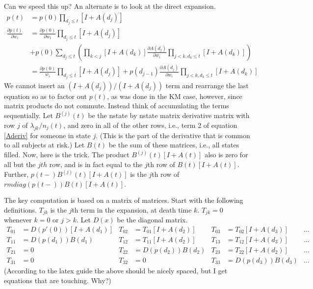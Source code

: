 \documentclass{article}
\begin{document}
Can we speed this up?
An alternate is to look at the direct expansion.
\begin{align}
  p(t) &= p(0) \prod_{d_j \le t} [I+ A(d_j)] \nonumber \\
  \frac{\partial p(t)}{\partial w_i} &=
     \frac{\partial p(0)}{\partial w_i} \prod_{d_j \le t} [I+ A(d_j)] \\
     &  + p(0)\sum_{d_j \le t} \left( \prod_{k<j}[I+ A(d_k)]
            \frac{\partial A(d_j)}{\partial w_i}  
            \prod_{j<k, d_k\le t}[I+ A(d_k)]  \right)\nonumber \\
   &= \frac{\partial p(0)}{w_i} \prod_{d_j \le t} [I+ A(d_j)] +  
            p(d_{j-1}) \frac{\partial A(d_j)}{\partial w_i}
            \prod_{j<k, d_k\le t}[I+ A(d_k)] \label{ajresidy}
\end{align}
We cannot insert an $(I+ A(d_j))/(I + A(d_j))$ term and rearrange the last
equation so as to factor out $p(t)$, as was done in the KM case, however,
since matrix products do not commute.
Instead think of accumulating the terms sequentially.  
Let $B^{(j)}(t)$ be the nstate by nstate matrix derivative matrix with
row $j$ of $\lambda_{jk}/n_j(t)$, and zero in all of the other
rows, i.e., term 2 of equation \eqref{Aderiv} for someone in state $j$.
(This is the part of the derivative that is common to all subjects at
risk.) Let $B(t)$ be the sum of these matrices, i.e., all states filled.
Now, here is the trick.  The product $B^{(j)}(t)[I + A(t)]$ also is
zero for all but the $jth$ row, and is in fact equal to the $j$th
row of $B(t)[I + A(t)]$.
Further, $p(t-)B^{(j)}(t)[I + A(t)]$ is the $j$th row of
${rm diag}(p(t-))B(t)[I + A(t)]$.

The key computation is based on a matrix of matrices.  Start with the following
definitions.  $T_{jk}$ is the $j$th term in the expansion, at
death time $k$.  $T_{jk}=0$ whenever $k=0$ or $j>k$.
Let $D(x)$ be the diagonal matrix.
\begin{align}
T_{01} &= D(p'(0))[I+ A(d_1)] & T_{02} &= T_{01}[I + A(d_2)] &
         T_{03} &= T_{02} [I + A(d_3)] &  \ldots \\
T_{11} &=  D(p(d_1)) B(d_1) & T_{12} &= T_{11}[I + A(d_2)] &
         T_{13} &= T_{12}[I + A(d_3)] & \ldots \\
T_{21} &=  0 & T_{22} &= D(p(d_2)) B(d_2) & T_{23} &= T_{22}[I+ A(d_2)] & \ldots \\
T_{31} &=  0 & T_{32}&=0 & T_{33} &= D(p(d_3)) B(d_3) &\ldots 
\end{align}
(According to the latex guide the above should be nicely spaced, but I get
equations that are touching.  Why?)
\end{document}
